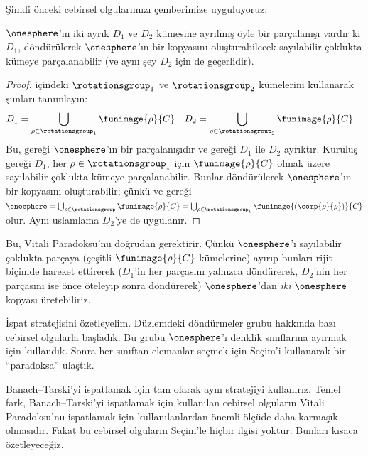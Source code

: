 Şimdi önceki cebirsel olgularımızı çemberimize uyguluyoruz:

\begin{lem}
$\onesphere$'ın iki ayrık $D_1$ ve $D_2$ kümesine ayrılmış öyle bir
parçalanışı vardır ki $D_1$, döndürülerek $\onesphere$'ın bir kopyasını
oluşturabilecek sayılabilir çoklukta kümeye parçalanabilir (ve aynı şey
$D_2$ için de geçerlidir).
\end{lem}

\begin{proof}
 içindeki $\rotationsgroup_1$ ve
$\rotationsgroup_2$ kümelerini kullanarak şunları tanımlayın:
\begin{align*}
	D_{1} &= \bigcup_{\rho \in \rotationsgroup_1} \funimage{\rho}{C} &
	D_{2} &= \bigcup_{\rho \in \rotationsgroup_2} \funimage{\rho}{C}
\end{align*}
Bu,  gereği $\onesphere$'ın bir parçalanışıdır ve
 gereği $D_1$ ile $D_2$ ayrıktır. Kuruluş gereği
$D_1$, her $\rho\in\rotationsgroup_1$ için $\funimage{\rho}{C}$ olmak
üzere sayılabilir çoklukta kümeye parçalanabilir. Bunlar döndürülerek
$\onesphere$'ın bir kopyasını oluşturabilir; çünkü
 ve  gereği
$\onesphere=\bigcup_{\rho\in\rotationsgroup}\funimage{\rho}{C}=
\bigcup_{\rho\in\rotationsgroup_1}
\funimage{(\comp{\rho}{\rho})}{C}$ olur. Aynı uslamlama $D_2$'ye de
uygulanır.
\end{proof}\noindent
Bu, Vitali Paradoksu'nu doğrudan gerektirir. Çünkü $\onesphere$'ı
sayılabilir çoklukta parçaya (çeşitli $\funimage{\rho}{C}$ kümelerine)
ayırıp bunları rijit biçimde hareket ettirerek ($D_1$'in her parçasını
yalnızca döndürerek, $D_2$'nin her parçasını ise önce öteleyip sonra
döndürerek) $\onesphere$'dan \emph{iki} $\onesphere$ kopyası üretebiliriz.

İspat stratejisini özetleyelim. Düzlemdeki döndürmeler grubu hakkında bazı
cebirsel olgularla başladık. Bu grubu $\onesphere$'ı denklik sınıflarına
ayırmak için kullandık. Sonra her sınıftan elemanlar seçmek için Seçim'i
kullanarak bir ``paradoksa'' ulaştık.

Banach--Tarski'yi ispatlamak için tam olarak aynı stratejiyi kullanırız.
Temel fark, Banach--Tarski'yi ispatlamak için kullanılan cebirsel olguların
Vitali Paradoksu'nu ispatlamak için kullanılanlardan önemli ölçüde daha
karmaşık olmasıdır. Fakat bu cebirsel olguların Seçim'le hiçbir ilgisi
yoktur. Bunları kısaca özetleyeceğiz.

